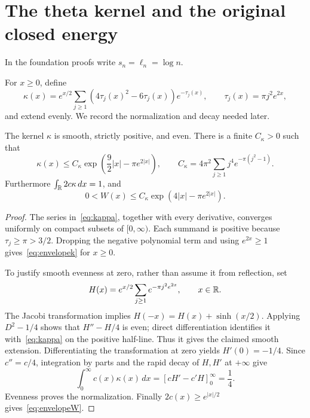 \section{The theta kernel and the original closed energy}\label{sec:energy}
In the foundation proofs write $s_n=\ell_n=\log n$.

For $x\ge0$, define
\begin{equation}\label{eq:kappa}
 \kappa(x)=e^{x/2}\sum_{j\ge1}(4\tau_j(x)^2-6\tau_j(x))e^{-\tau_j(x)},
 \qquad \tau_j(x)=\pi j^2e^{2x},
\end{equation}
and extend evenly. We record the normalization and decay needed later.

\begin{lemma}\label{lem:theta}
The kernel $\kappa$ is smooth, strictly positive, and even. There is a finite $C_\kappa>0$ such that
\begin{equation}\label{eq:envelopek}
 \kappa(x)\le C_\kappa\exp\!\left(\frac92|x|-\pi e^{2|x|}\right),
 \qquad
 C_\kappa=4\pi^2\sum_{j\ge1}j^4e^{-\pi(j^2-1)}.
\end{equation}
Furthermore $\int_\mathbb R2c\kappa\,dx=1$, and
\begin{equation}\label{eq:envelopeW}
 0<W(x)\le C_\kappa\exp(4|x|-\pi e^{2|x|}).
\end{equation}
\end{lemma}
\begin{proof}
The series in~\eqref{eq:kappa}, together with every derivative, converges uniformly on compact subsets of $[0,\infty)$. Each summand is positive because $\tau_j\ge\pi>3/2$. Dropping the negative polynomial term and using $e^{2x}\ge1$ gives~\eqref{eq:envelopek} for $x\ge0$.

To justify smooth evenness at zero, rather than assume it from reflection, set
\[
 H(x)=e^{x/2}\sum_{j\ge1}e^{-\pi j^2e^{2x}},\qquad x\in\mathbb R.
\]
The Jacobi transformation \cite[Eq.~20.7.32]{DLMF} implies
$H(-x)=H(x)+\sinh(x/2)$. Applying $D^2-1/4$ shows that $H''-H/4$ is even; direct differentiation identifies it with~\eqref{eq:kappa} on the positive half-line. Thus it gives the claimed smooth extension. Differentiating the transformation at zero yields $H'(0)=-1/4$. Since $c''=c/4$, integration by parts and the rapid decay of $H,H'$ at $+\infty$ give
\[
 \int_0^\infty c(x)\kappa(x)\,dx
  =[cH'-c'H]_0^\infty=\frac14.
\]
Evenness proves the normalization. Finally $2c(x)\ge e^{|x|/2}$ gives~\eqref{eq:envelopeW}.
\end{proof}

